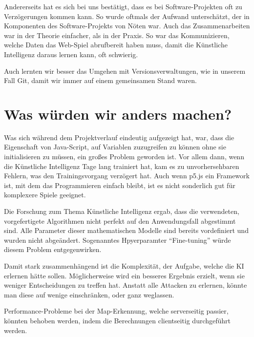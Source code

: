 Andererseits hat es sich bei uns bestätigt, dass es bei Software-Projekten oft zu Verzögerungen kommen kann.
So wurde oftmals der Aufwand unterschätzt, der in Komponenten des Software-Projekts von Nöten war.
Auch das Zusammenarbeiten war in der Theorie einfacher, als in der Praxis. So war das Kommunizieren, welche Daten das Web-Spiel abrufbereit haben muss, damit die Künstliche Intelligenz daraus lernen kann, oft schwierig.

Auch lernten wir besser das Umgehen mit Versionsverwaltungen, wie in unserem Fall Git, damit wir immer auf einem gemeinsamen Stand waren.

\section{Was würden wir anders machen?}
Was sich während dem Projektverlauf eindeutig aufgezeigt hat, war, dass die Eigenschaft von Java-Script, auf Variablen zuzugreifen zu können ohne sie initialisieren zu müssen, ein großes Problem geworden ist.
Vor allem dann, wenn die Künstliche Intelligenz Tage lang trainiert hat, kam es zu unvorhersehbaren Fehlern, was den Trainingsvorgang verzögert hat.
Auch wenn p5.js ein Framework ist, mit dem das Programmieren einfach bleibt, ist es nicht sonderlich gut für komplexere Spiele geeignet.

Die Forschung zum Thema Künstliche Intelligenz ergab, dass die verwendeten, vorgefertigete Algorithmen nicht perfekt auf den Anwendungsfall abgestimmt sind.
Alle Parameter dieser mathematischen Modelle sind bereits vordefiniert und wurden nicht abgeändert.
Sogenanntes Hpyerparamter ``Fine-tuning'' würde diesem Problem entgegenwirken.

Damit stark zusammenhängend ist die Komplexität, der Aufgabe, welche die KI erlernen hätte sollen.
Möglicherweise wird ein besseres Ergebnis erzielt, wenn sie weniger Entscheidungen zu treffen hat.
Anstatt alle Attacken zu erlernen, könnte man diese auf wenige einschränken, oder ganz weglassen.

Performance-Probleme bei der Map-Erkennung, welche serverseitig passier, könnten behoben werden, indem
die Berechnungen clientseitig durchgeführt werden.